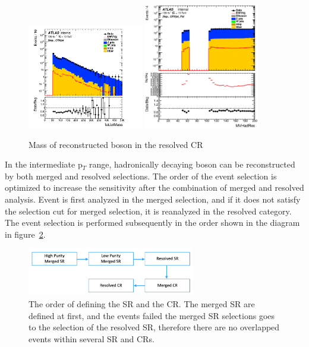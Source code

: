 \begin{figure}[H]
    \centering
    \includegraphics[width=0.45\textwidth]{figures/2lep/dataMC/C_0ptag1pfat0pjet_0ptv_CRVjet_fatJetMass_Log}
    \includegraphics[width=0.45\textwidth]{figures/2lep/dataMC/C_0ptag2pjet_0ptv_CRVjet_Fid_MVHadRes_Log}
    \caption{Mass of reconstructed boson in the resolved CR}
    \label{fig:CRVjet}
\end{figure}

In the intermediate p$_T$ range, hadronically decaying boson can be reconstructed by both merged and resolved selections.
The order of the event selection is optimized to increase the sensitivity after the combination of merged and resolved analysis. 
Event is first analyzed in the merged selection, and if it does not satisfy the selection cut for merged selection, it is reanalyzed in the resolved category.
The event selection is performed subsequently in the order shown in the diagram in figure~\ref{fig:order}.
\begin{figure}[H]
    \centering
    \includegraphics[width=0.65\textwidth]{figures/order}
    \caption{The order of defining the SR and the CR. The merged SR are defined at first, and the events failed the merged SR selections goes to the selection of the resolved SR, therefore there are no overlapped events within several SR and CRs.}
    \label{fig:order}
\end{figure}

